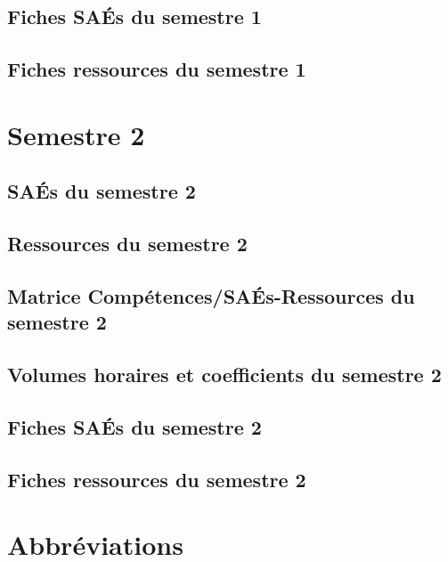 \documentclass[10pt,lualatex,french]{article}
\begin{document}


\newpage

\subsection{Fiches SAÉs du semestre 1}
\affichageSAE{\sem}
\newpage

\subsection{Fiches ressources du semestre 1}
\affichageRessource{\sem}

\section{Semestre 2}
\def\sem{B} %

\subsection{SAÉs du semestre 2}

\listeTitreSAE{\sem}

\subsection{Ressources du semestre 2}

\listeTitreRessource{\sem}

\subsection{Matrice Compétences/SAÉs-Ressources du semestre 2}

\scalebox{0.95}{}

\subsection{Volumes horaires et coefficients du semestre 2}



\newpage

\subsection{Fiches SAÉs du semestre 2}
\affichageSAE{\sem}

\subsection{Fiches ressources du semestre 2}
\affichageRessource{\sem}

\section{Abbréviations}

\begin{multicols}{2}\small

\end{multicols}
\end{document}
